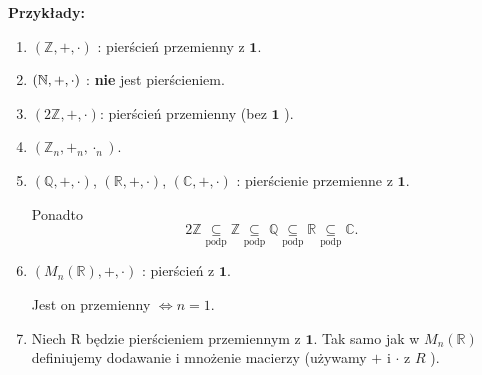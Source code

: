 \noindent \textbf{Przykłady:} 
\begin{enumerate}[label=\arabic*)]
	\item $\left( \mathbb{Z} , +, \cdot  \right) $ : pierścień przemienny z $\mathbf{1}$.
	\item $\left( \mathbb{N}, +, \cdot  \right) $ : \textbf{nie} jest pierścieniem. 
	\item $\left( 2\mathbb{Z}, +, \cdot  \right) $: pierścień przemienny (bez $\mathbf{1}$ ).
	\item $\left( \mathbb{Z} _{n}, +_{\scriptscriptstyle n}, \cdot _{\scriptscriptstyle n} \right) $.
	\item $\left( \mathbb{Q} , +,\cdot  \right) $, $\left( \mathbb{R} , +, \cdot  \right) $, $\left( \mathbb{C}, +, \cdot  \right) $ : pierścienie przemienne z $\mathbf{1}$.

	Ponadto \[
	2\mathbb{Z} \underset{\scriptscriptstyle\text{podp}}{\subseteq} \mathbb{Z} \underset{\scriptscriptstyle\text{podp}}{\subseteq} \mathbb{Q} \underset{\scriptscriptstyle\text{podp}}{\subseteq} \mathbb{R} \underset{\scriptscriptstyle\text{podp}}{\subseteq} \mathbb{C} 
	.\] 
	\item $\left( M_{n}\left( \mathbb{R}  \right), +, \cdot  \right) $ : pierścień z $\mathbf{1}$.

	Jest on przemienny $\iff n=1$.
    	\item Niech R będzie pierścieniem przemiennym z $\mathbf{1}$. Tak samo jak w $M_{n}\left( \mathbb{R}  \right) $ definiujemy dodawanie i mnożenie macierzy (używamy $+$ i $\cdot $ z $R$ ).
	

\end{enumerate}
